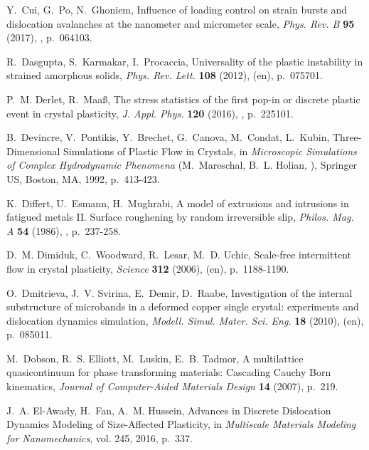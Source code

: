 \documentclass[CRPHYS,Unicode,manuscript]{cedram}
\begin{document}
\begin{thebibliography}{100}
Y.~Cui, G.~Po, N.~Ghoniem, {\og Influence of loading control on strain bursts
  and dislocation avalanches at the nanometer and micrometer scale\fg},
  \emph{Phys. Rev. B} \textbf{95} (2017), , p.~064103.

R.~Dasgupta, S.~Karmakar, I.~Procaccia, {\og Universality of the plastic
  instability in strained amorphous solids\fg}, \emph{Phys. Rev. Lett.}
  \textbf{108} (2012),  (en), p.~075701.

P.~M. Derlet, R.~Maa{\ss}, {\og The stress statistics of the first pop-in or
  discrete plastic event in crystal plasticity\fg}, \emph{J. Appl. Phys.}
  \textbf{120} (2016), , p.~225101.

B.~Devincre, V.~Pontikis, Y.~Brechet, G.~Canova, M.~Condat, L.~Kubin, {\og
  {Three-Dimensional} Simulations of Plastic Flow in Crystals\fg}, in
  \emph{Microscopic Simulations of Complex Hydrodynamic Phenomena}
  (M.~Mareschal, B.~L. Holian, \cdredsname), Springer US, Boston, MA, 1992,
  p.~413-423.

K.~Differt, U.~Esmann, H.~Mughrabi, {\og A model of extrusions and intrusions
  in fatigued metals {II}. Surface roughening by random irreversible slip\fg},
  \emph{Philos. Mag. A} \textbf{54} (1986), , p.~237-258.

D.~M. Dimiduk, C.~Woodward, R.~Lesar, M.~D. Uchic, {\og Scale-free intermittent
  flow in crystal plasticity\fg}, \emph{Science} \textbf{312} (2006),
   (en), p.~1188-1190.

O.~Dmitrieva, J.~V. Svirina, E.~Demir, D.~Raabe, {\og Investigation of the
  internal substructure of microbands in a deformed copper single crystal:
  experiments and dislocation dynamics simulation\fg}, \emph{Modell. Simul.
  Mater. Sci. Eng.} \textbf{18} (2010),  (en), p.~085011.

M.~Dobson, R.~S. Elliott, M.~Luskin, E.~B. Tadmor, {\og A multilattice
  quasicontinuum for phase transforming materials: Cascading Cauchy Born
  kinematics\fg}, \emph{Journal of Computer-Aided Materials Design} \textbf{14}
  (2007), p.~219.

J.~A. El-Awady, H.~Fan, A.~M. Hussein, {\og Advances in Discrete Dislocation
  Dynamics Modeling of {Size-Affected} Plasticity\fg}, in \emph{Multiscale
  Materials Modeling for Nanomechanics}, vol. 245, 2016, p.~337.


\end{thebibliography}
\end{document}
